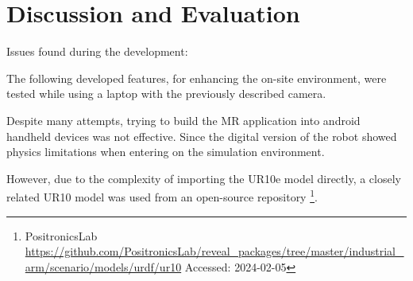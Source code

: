 \chapter{Discussion and Evaluation}

Issues found during the development:

The following developed features, for enhancing the on-site environment, were tested while using a laptop with the previously described camera.

    Despite many attempts, trying to build the \ac{MR} application into android handheld devices was not effective.
    Since the digital version of the robot showed physics limitations when entering on the simulation environment.


    However, due to the complexity of importing the UR10e model directly, a closely related UR10 model was used from an open-source repository \footnote{PositronicsLab \url{https://github.com/PositronicsLab/reveal_packages/tree/master/industrial_arm/scenario/models/urdf/ur10} Accessed: 2024-02-05}. 
